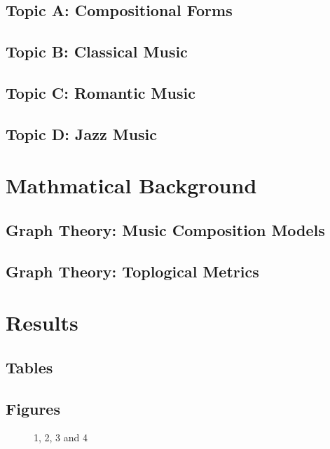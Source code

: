 \subsection{Topic A: Compositional Forms}

\subsection{Topic B: Classical Music}

\subsection{Topic C: Romantic Music}

\subsection{Topic D: Jazz Music}

\section{Mathmatical Background}

\subsection{Graph Theory: Music Composition Models}

\subsection{Graph Theory: Toplogical Metrics}

\section{Results}

\subsection{Tables}


\subsection{Figures}

\begin{figure}[H]
	\centering
	\begin{minipage}[b]{0.5\linewidth}
	\end{minipage}\hfill
	\begin{minipage}[b]{0.5\linewidth}
	\end{minipage}\hfill	
	\begin{minipage}[b]{0.5\linewidth}
	\end{minipage}\hfill
	\begin{minipage}[b]{0.5\linewidth}
	\end{minipage}\hfill
	\caption{1, 2, 3 and 4}
	\label{fig:Figure1}
\end{figure} 


